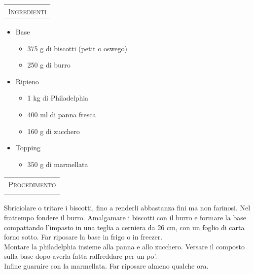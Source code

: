\noindent
\begin{minipage}[t][\textheight][t]{\textwidth}


    \begin{minipage}[t]{0.3\textwidth}
        \vspace{2.5cm}

        \begin{tabularx}{\linewidth}{X}
        {\Large \textsc{Ingredienti}} \\ %
        \end{tabularx}

		\begin{itemize}[label={}, left=2pt]
		\item Base
        \begin{itemize}[label={}, left=10pt]
            \item 375 g di biscotti (petit o oswego)
            \item 250 g di burro
        \end{itemize}
        \item Ripieno
        \begin{itemize}[label={}, left=10pt]
			\item 1 kg di Philadelphia
        		\item 400 ml di panna fresca
        		\item 160 g di zucchero
        \end{itemize}
        \item Topping
        \begin{itemize}[label={}, left=10pt]
			\item 350 g di marmellata
        \end{itemize}
        
       	\end{itemize}
    \end{minipage}%
    \hfill
    \begin{minipage}[t]{0.65\textwidth}
        \begin{tabularx}{\linewidth}{X}
        \\
        {\Large \textsc{Procedimento}} \\ \\%
        \end{tabularx}
		Sbriciolare o tritare i biscotti, fino a renderli abbastanza fini ma non farinosi. Nel frattempo fondere il burro. Amalgamare i biscotti con il burro e formare la base compattando l'impasto in una teglia a cerniera da 26 cm, con un foglio di carta forno sotto. Far riposare la base in frigo o in freezer.\\
		Montare la philadelphia insieme alla panna e allo zucchero. Versare il composto sulla base dopo averla fatta raffreddare per un po'.\\
		Infine guarnire con la marmellata. Far riposare almeno qualche ora.
        

\end{minipage}
\end{minipage}
